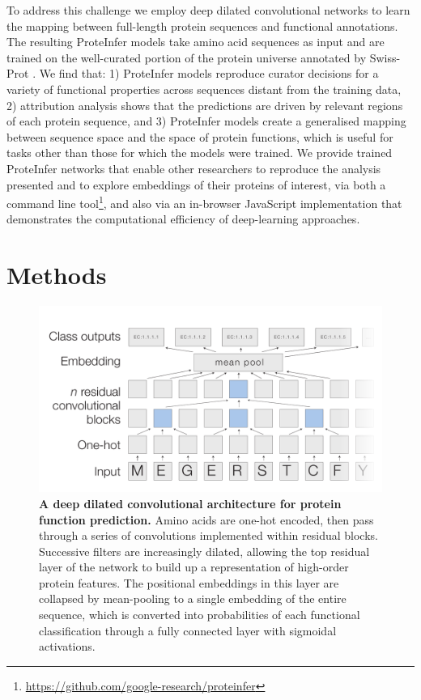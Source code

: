 To address this challenge we employ deep dilated convolutional networks to learn the mapping between full-length protein sequences and functional annotations. The resulting ProteInfer models take amino acid sequences as input and are trained on the well-curated portion of the protein universe annotated by Swiss-Prot \cite{uniprotlatest}. We find that: 1) ProteInfer models reproduce curator decisions for a  variety of functional properties across sequences distant from the training data, 2) attribution analysis shows that the predictions are driven by relevant regions of each protein sequence, and 3) ProteInfer models create a generalised mapping between sequence space and the space of protein functions, which is useful for tasks other than those for which the models were trained. We provide trained ProteInfer networks that enable other researchers to reproduce the analysis presented and to explore embeddings of their proteins of interest, via both a command line tool\footnote{\url{https://github.com/google-research/proteinfer}}, and also via an in-browser JavaScript implementation that demonstrates the computational efficiency of deep-learning approaches.
\section*{Methods}

\begin{figure}[h!]
\centering
  \includegraphics[width=\columnwidth]{figure.pdf}%
  \caption{\textbf{A deep dilated convolutional architecture for protein function prediction.} Amino acids are one-hot encoded, then pass through a series of convolutions implemented within residual blocks. Successive filters are increasingly dilated, allowing the top residual layer of the network to build up a representation of high-order protein features. The positional embeddings in this layer are collapsed by mean-pooling to a single embedding of the entire sequence, which is converted into probabilities of each functional classification through a fully connected layer with sigmoidal activations. }
  \label{architecture}
\end{figure}
